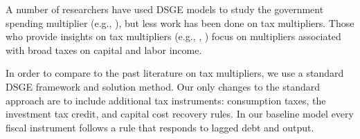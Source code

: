 \documentclass[article,11pt,letterpaper,fleqn]{article}
\theoremstyle{definition}
\numberwithin{equation}{section}
\begin{document}
A number of researchers have used DSGE models to study the government spending multiplier (e.g., \citet{CER2010}), but less work has been done on tax multipliers.  Those who provide insights on tax multipliers (e.g., \citet{Zubairy2014}, \citet{IMF2010}) focus on multipliers associated with broad taxes on capital and labor income.


In order to compare to the past literature on tax multipliers, we use a standard DSGE framework and solution method. Our only changes to the standard approach are to include additional tax instruments: consumption taxes, the investment tax credit, and capital cost recovery rules. In our baseline model every fiscal instrument follows a rule that responds to lagged debt and output.
\end{document}
